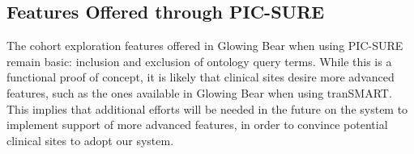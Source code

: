 \subsection{Features Offered through PIC-SURE}
The cohort exploration features offered in Glowing Bear when using PIC-SURE remain basic: inclusion and exclusion of ontology query terms.
While this is a functional proof of concept, it is likely that clinical sites desire more advanced features, such as the ones available in Glowing Bear when using tranSMART.
This implies that additional efforts will be needed in the future on the system to implement support of more advanced features, in order to convince potential clinical sites to adopt our system.
